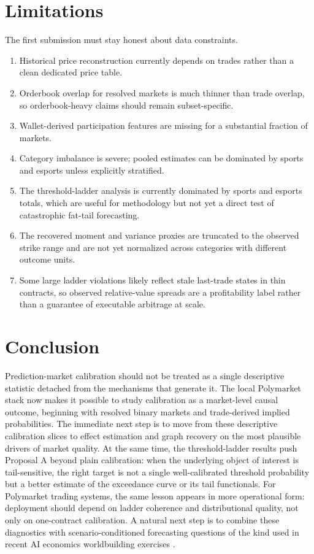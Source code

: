 \documentclass[10pt]{article}
\begin{document}
\section{Limitations}

The first submission must stay honest about data constraints.
\begin{enumerate}[leftmargin=1.5em,itemsep=0.2em]
  \item Historical price reconstruction currently depends on trades rather than
  a clean dedicated price table.
  \item Orderbook overlap for resolved markets is much thinner than trade
  overlap, so orderbook-heavy claims should remain subset-specific.
  \item Wallet-derived participation features are missing for a substantial
  fraction of markets.
  \item Category imbalance is severe; pooled estimates can be dominated by
  sports and esports unless explicitly stratified.
  \item The threshold-ladder analysis is currently dominated by sports and
  esports totals, which are useful for methodology but not yet a direct test of
  catastrophic fat-tail forecasting.
  \item The recovered moment and variance proxies are truncated to the observed
  strike range and are not yet normalized across categories with different
  outcome units.
  \item Some large ladder violations likely reflect stale last-trade states in
  thin contracts, so observed relative-value spreads are a profitability label
  rather than a guarantee of executable arbitrage at scale.
\end{enumerate}

\section{Conclusion}

Prediction-market calibration should not be treated as a single descriptive
statistic detached from the mechanisms that generate it. The local Polymarket
stack now makes it possible to study calibration as a market-level causal
outcome, beginning with resolved binary markets and trade-derived implied
probabilities. The immediate next step is to move from these descriptive
calibration slices to effect estimation and graph recovery on the most plausible
drivers of market quality. At the same time, the threshold-ladder results push
Proposal A beyond plain calibration: when the underlying object of interest is
tail-sensitive, the right target is not a single well-calibrated threshold
probability but a better estimate of the exceedance curve or its tail
functionals. For Polymarket trading systems, the same lesson appears in more
operational form: deployment should depend on ladder coherence and
distributional quality, not only on one-contract calibration. A natural next
step is to combine these diagnostics with scenario-conditioned forecasting
questions of the kind used in recent AI economics worldbuilding exercises
\citep{convergence2024threshold2030}.



\end{document}
